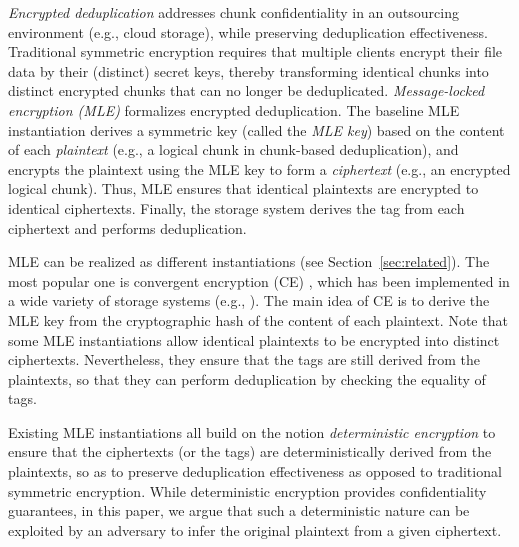 \documentclass[bachelor]{thesis-uestc}
\begin{document}
{\em Encrypted deduplication} addresses chunk confidentiality in an
outsourcing environment (e.g., cloud storage), while preserving deduplication
effectiveness.  Traditional symmetric encryption requires that multiple
clients encrypt their file data by their (distinct) secret keys, thereby
transforming identical chunks into distinct encrypted chunks that can no
longer be deduplicated.  {\em Message-locked encryption (MLE)}
\cite{bellare13a} formalizes encrypted deduplication.  The baseline MLE
instantiation derives a symmetric key (called the {\em MLE key}) based on the
content of each {\em plaintext} (e.g., a logical chunk in chunk-based
deduplication), and encrypts the plaintext using the MLE key to form a {\em
ciphertext} (e.g., an encrypted logical chunk).  Thus, MLE ensures that
identical plaintexts are encrypted to identical ciphertexts.  Finally, the
storage system derives the tag from each ciphertext and performs
deduplication.  

MLE can be realized as different instantiations (see Section~\ref{sec:related}). The
most popular one is convergent encryption (CE) \cite{douceur02}, which has
been implemented in a wide variety of storage systems (e.g., 
\cite{adya02,elephantdrive,mega,gnunet,freenet,cryptosphere,cox02,storer08,
anderson10}).  The main idea of CE is to derive the MLE key from the
cryptographic hash of the content of each plaintext.  Note that some MLE
instantiations \cite{bellare13a} allow identical plaintexts to be encrypted
into distinct ciphertexts.  Nevertheless, they ensure that the tags are still
derived from the plaintexts, so that they can perform deduplication by
checking the equality of tags. 

Existing MLE instantiations all build on the notion {\em deterministic
encryption} to ensure that the ciphertexts (or the tags) are deterministically
derived from the plaintexts, so as to preserve deduplication effectiveness as
opposed to traditional symmetric encryption.  While deterministic encryption
provides confidentiality guarantees, in this paper, we argue that such a
deterministic nature can be exploited by an adversary to infer the original
plaintext from a given ciphertext. 


\end{document}
